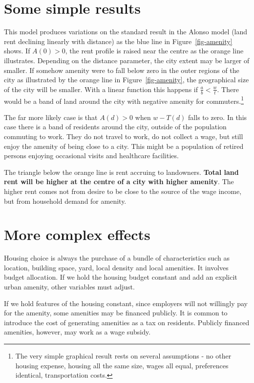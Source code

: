 \section{Some simple results}
 This model produces  variations on the standard result in the Alonso model (land rent declining linearly with distance) as the blue line in Figure~\ref{fig-amenity} shows.  If $A(0)>0$, the rent profile is raised near the centre as the  orange line illustrates. Depending on the distance parameter, the city extent may be larger of smaller.  If somehow amenity were to fall below zero in the outer regions of the city as illustrated by the orange line  in Figure~\ref{fig-amenity}, the geographical size of the  city will be smaller. With a linear function this happens if $\frac{a}{b} < \frac{w}{t}$. There would be a band of land around the city with negative amenity for commuters.\footnote{The very simple graphical result rests on several assumptions - no other housing expense, housing all the same size, wages all equal, preferences identical, transportation costs.}

The far more likely case is that $A(d) > 0$ when $w-T(d)$ falls to zero. In this case there is a band of  residents around the city, outside of the population commuting to work. They do not travel to work,  do not collect a wage, but still enjoy the amenity of being close to a city. This might be a population of retired persons enjoying occasional visits and healthcare facilities.

The triangle below the orange line is rent accruing to landowners. \textbf{Total land rent will be higher at the centre of a city with higher amenity}. The  higher rent comes not from desire to be close to the source of the wage income, but from household demand for amenity.  

\section{More complex effects}
Housing choice is always the purchase of  a bundle of characteristics such as location, building space, yard, local density and local amenities. It involves budget allocation. If we hold the housing budget constant and add an explicit urban amenity, other variables must adjust. 

If we hold features of the housing constant,
since employers will not willingly pay for the amenity, some amenities may be financed publicly. It is common to introduce the cost of generating amenities as a tax on residents. Publicly financed amenities, however, may work as a wage subsidy.  
   


